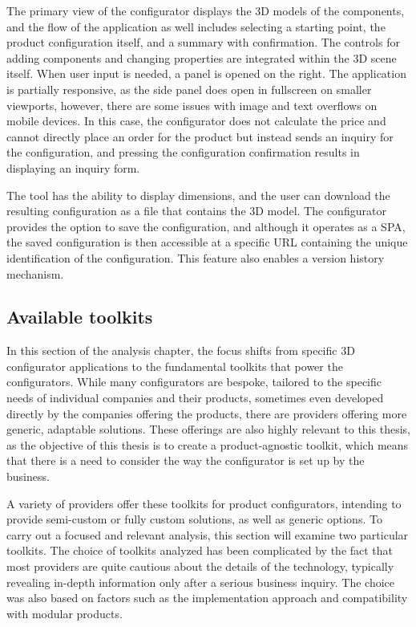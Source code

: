 The primary view of the configurator displays the 3D models of the components, and the flow of the application as well includes selecting a starting point, the product configuration itself, and a summary with confirmation. The controls for adding components and changing properties are integrated within the 3D scene itself. When user input is needed, a panel is opened on the right. The application is partially responsive, as the side panel does open in fullscreen on smaller viewports, however, there are some issues with image and text overflows on mobile devices. In this case, the configurator does not calculate the price and cannot directly place an order for the product but instead sends an inquiry for the configuration, and pressing the configuration confirmation results in displaying an inquiry form.

The tool has the ability to display dimensions, and the user can download the resulting configuration as a file that contains the 3D model. The configurator provides the option to save the configuration, and although it operates as a SPA, the saved configuration is then accessible at a specific URL containing the unique identification of the configuration. This feature also enables a version history mechanism.


\subsection{Available toolkits}

In this section of the analysis chapter, the focus shifts from specific 3D configurator applications to the fundamental toolkits that power the configurators. While many configurators are bespoke, tailored to the specific needs of individual companies and their products, sometimes even developed directly by the companies offering the products, there are providers offering more generic, adaptable solutions. These offerings are also highly relevant to this thesis, as the objective of this thesis is to create a product-agnostic toolkit, which means that there is a need to consider the way the configurator is set up by the business.

A variety of providers offer these toolkits for product configurators, intending to provide semi-custom or fully custom solutions, as well as generic options. To carry out a focused and relevant analysis, this section will examine two particular toolkits. The choice of toolkits analyzed has been complicated by the fact that most providers are quite cautious about the details of the technology, typically revealing in-depth information only after a serious business inquiry. The choice was also based on factors such as the implementation approach and compatibility with modular products.


